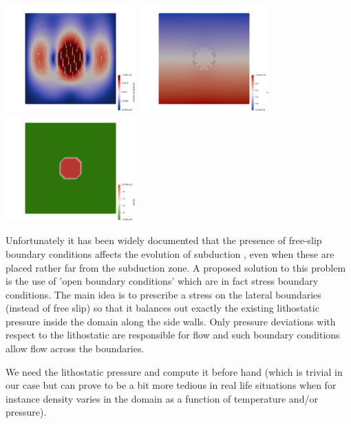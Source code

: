 \begin{center}
\includegraphics[width=5cm]{python_codes/fieldstone_29/results/sphere_free_slip/vel}
\includegraphics[width=5cm]{python_codes/fieldstone_29/results/sphere_free_slip/p}
\includegraphics[width=5cm]{python_codes/fieldstone_29/results/sphere_free_slip/density}
\end{center}

Unfortunately it has been widely documented that the presence of free-slip 
boundary conditions affects the evolution of subduction \cite{chgv12}, 
even when these are placed rather far from the subduction zone. 
A proposed solution to this problem is the use of 'open boundary conditions'
which are in fact stress boundary conditions. 
The main idea is to prescribe a stress on the lateral boundaries (instead of free slip)
so that it balances out exactly the existing lithostatic pressure inside the domain 
along the side walls. Only pressure deviations with respect to the 
lithostatic are responsible for flow and such boundary conditions allow flow  
across the boundaries.

We need the lithostatic pressure and compute it before hand (which is trivial in 
our case but can prove to be a bit more tedious in real life situations when for instance
density varies in the domain as a function of temperature and/or pressure).

